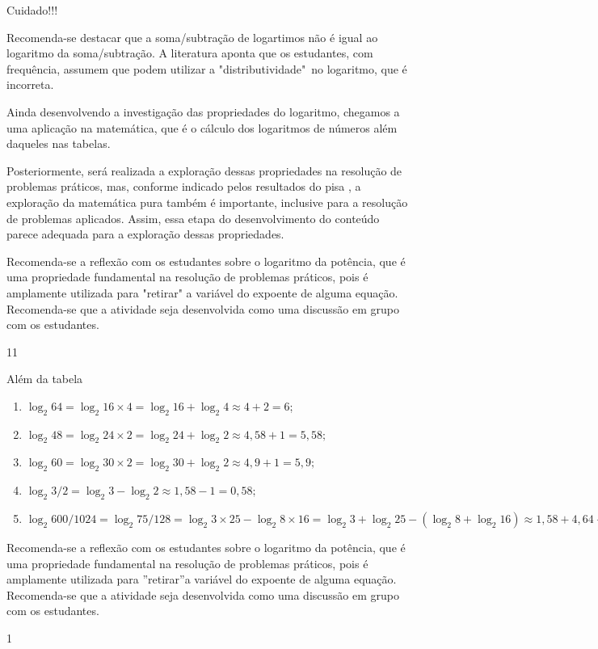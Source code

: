 \clearmargin
\begin{sugestions}{Cuidado!!!}
{
	Recomenda-se destacar que a soma/subtração de logartimos não é igual ao logaritmo da soma/subtração. A literatura aponta que os estudantes, com frequência, assumem que podem utilizar a "distributividade"\, no logaritmo, que é incorreta.


	Ainda desenvolvendo a investigação das propriedades do logaritmo, chegamos a uma aplicação na matemática, que é o cálculo dos logaritmos de números além daqueles nas tabelas.

	Posteriormente, será realizada a exploração dessas propriedades na resolução de problemas práticos, mas, conforme indicado pelos resultados do pisa \citep{OCDE2016}, a exploração da matemática pura também é importante, inclusive para a resolução de problemas aplicados. Assim, essa etapa do desenvolvimento do conteúdo parece adequada para a exploração dessas propriedades.


	Recomenda-se a reflexão com os estudantes sobre o logaritmo da potência, que é uma propriedade fundamental na resolução de problemas práticos, pois é amplamente utilizada para "retirar" a variável do expoente de alguma equação. Recomenda-se que a atividade seja desenvolvida como uma discussão em grupo com os estudantes.
}{1}{1}
\end{sugestions}
\begin{answer}{Além da tabela}
{
	\begin{enumerate}
	\item $\log_2 64 = \log_2 16 \times 4= \log_2 16 + \log_2 4 \approx 4+2 =6$;
	\item $\log_2 48 = \log_2 24 \times 2= \log_2 24 + \log_2 2 \approx 4{,}58+1 =5{,}58;$
	\item $\log_2 60 = \log_2 30 \times 2= \log_2 30 + \log_2 2 \approx 4{,}9+1 =5{,}9;$
	\item $\log_2 3/2 = \log_2 3 - \log_2 2 \approx 1{,}58-1 =0{,}58;$
	\item $\log_2 600/1024 = \log_2 75/128= \log_2 3 \times 25- \log_2 8 \times 16= \log_2 3 + \log_2 25- (\log_2 8 +\log_2 16) \approx 1{,}58 + 4{,}64-(3+4)= 6{,}22-7 = -0{,}78.$
	\end{enumerate}


Recomenda-se a reflexão com os estudantes sobre o logaritmo da potência,
que é uma propriedade fundamental na resolução de problemas
práticos, pois é amplamente utilizada para ”retirar”a variável do
expoente de alguma equação. Recomenda-se que a atividade seja desenvolvida
como uma discussão em grupo com os estudantes.
}{1}
\end{answer}
